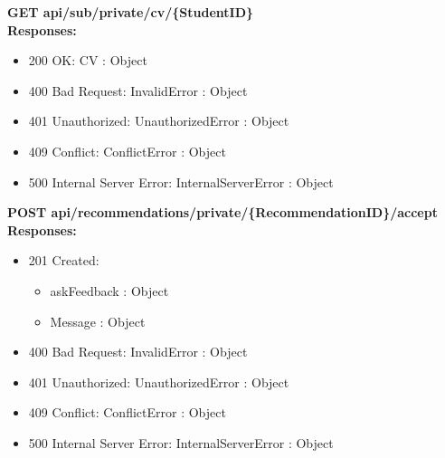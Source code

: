 \noindent\textbf{\color{titleColor}GET api/sub/private/cv/\{StudentID\}}
\vspace{2pt}
\\\textbf{\color{titleColor}Responses:} 
\begin{itemize}
    \item {\color{titleColor}200 OK:} CV : Object
    \item {\color{titleColor}400 Bad Request:} InvalidError : Object
    \item {\color{titleColor}401 Unauthorized:} UnauthorizedError : Object
    \item {\color{titleColor}409 Conflict:} ConflictError : Object
    \item {\color{titleColor}500 Internal Server Error:} InternalServerError : Object
\end{itemize}
\vspace{10pt}
\noindent{\color{titleColor}\rule{0.8\linewidth}{0.2mm}}
\vspace{10pt}

\noindent\textbf{\color{titleColor}POST api/recommendations/private/\{RecommendationID\}/accept}
\vspace{2pt}
\\\textbf{\color{titleColor}Responses:} 
\begin{itemize}
    \item {\color{titleColor}201 Created:} 
    \begin{itemize}
        \item askFeedback : Object
        \item Message : Object
    \end{itemize}
    \item {\color{titleColor}400 Bad Request:} InvalidError : Object
    \item {\color{titleColor}401 Unauthorized:} UnauthorizedError : Object
    \item {\color{titleColor}409 Conflict:} ConflictError : Object
    \item {\color{titleColor}500 Internal Server Error:} InternalServerError : Object
\end{itemize}
\vspace{10pt}
\noindent{\color{titleColor}\rule{0.8\linewidth}{0.2mm}}
\vspace{10pt}

